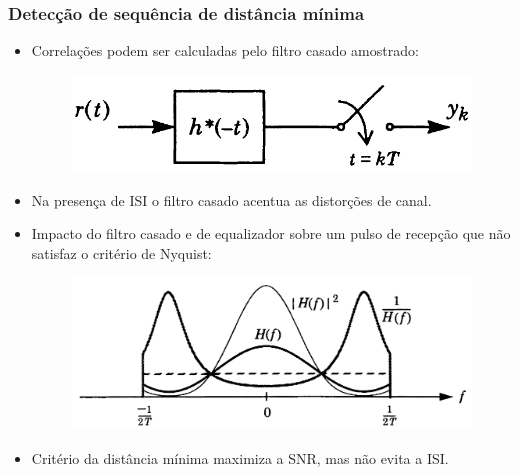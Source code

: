 \begin{frame}
	\frametitle{Detecção de sequência de distância mínima}

	\begin{itemize}
	    \item Correlações podem ser calculadas pelo filtro casado amostrado:
	    \begin{figure}[t]	
		\begin{center}
		\includegraphics[width=0.35\columnwidth]{figs/pam_31}
		\end{center} 
	    \end{figure}
	    \item Na presença de ISI o filtro casado acentua as distorções de canal.
	    \item Impacto do filtro casado e de equalizador sobre um pulso de recepção que não satisfaz o critério de Nyquist:
	    \begin{figure}[t]	
		\begin{center}
		\includegraphics[width=0.5\columnwidth]{figs/pam_32}
		\end{center} 
	    \end{figure}
	    \item Critério da distância mínima maximiza a SNR, mas não evita a ISI.
	\end{itemize}
\end{frame}

